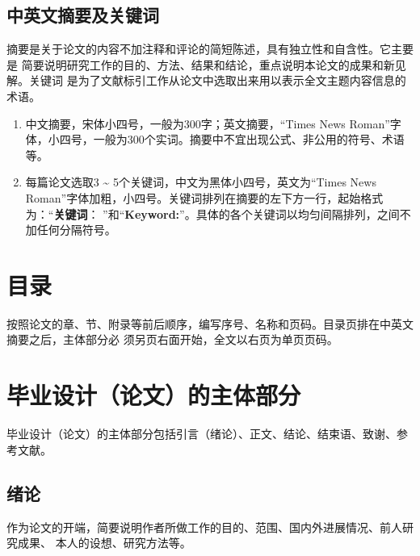 \subsection{中英文摘要及关键词}
摘要是关于论文的内容不加注释和评论的简短陈述，具有独立性和自含性。它主要是
简要说明研究工作的目的、方法、结果和结论，重点说明本论文的成果和新见解。关键词
是为了文献标引工作从论文中选取出来用以表示全文主题内容信息的术语。
\begin{enumerate}
  \item 中文摘要，宋体小四号，一般为300字；英文摘要，``Times News Roman''字
体，小四号，一般为300个实词。摘要中不宜出现公式、非公用的符号、术语等。
  \item 每篇论文选取3 \~{} 5个关键词，中文为黑体小四号，英文为``Times News Roman''字体加粗，小四号。关键词排列在摘要的左下方一行，起始格式为：``\textbf{关键词}：
      ''和``\textbf{Keyword:}''。具体的各个关键词以均匀间隔排列，之间不加任何分隔符号。
\end{enumerate}

\section{目录}
按照论文的章、节、附录等前后顺序，编写序号、名称和页码。目录页排在中英文摘要之后，主体部分必
须另页右面开始，全文以右页为单页页码。

\section{毕业设计（论文）的主体部分}
毕业设计（论文）的主体部分包括引言（绪论）、正文、结论、结束语、致谢、参考文献。
\subsection{绪论}
作为论文的开端，简要说明作者所做工作的目的、范围、国内外进展情况、前人研究成果、
本人的设想、研究方法等。

